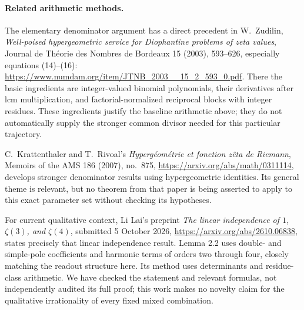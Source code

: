 \documentclass[11pt]{article}
\begin{document}
\paragraph{Related arithmetic methods.}
The elementary denominator argument has a direct precedent in
W.~Zudilin, \emph{Well-poised hypergeometric service for Diophantine problems
of zeta values}, Journal de Th\'eorie des Nombres de Bordeaux
15 (2003), 593--626, especially equations (14)--(16):
\url{https://www.numdam.org/item/JTNB_2003__15_2_593_0.pdf}.
There the basic ingredients are integer-valued binomial polynomials,
their derivatives after lcm multiplication, and factorial-normalized
reciprocal blocks with integer residues. These ingredients justify the
baseline arithmetic above; they do not automatically supply the stronger
common divisor needed for this particular trajectory.

C.~Krattenthaler and T.~Rivoal's \emph{Hyperg\'eom\'etrie et fonction z\^eta de
Riemann}, Memoirs of the AMS 186 (2007), no.~875,
\url{https://arxiv.org/abs/math/0311114}, develops stronger denominator
results using hypergeometric identities. Its general theme is relevant,
but no theorem from that paper is being asserted to apply to this exact
parameter set without checking its hypotheses.

For current qualitative context, Li Lai's preprint
\emph{The linear independence of $1$, $\zeta(3)$, and $\zeta(4)$},
submitted 5 October 2026,
\url{https://arxiv.org/abs/2610.06838}, states precisely that linear
independence result. Lemma 2.2 uses double- and simple-pole coefficients
and harmonic terms of orders two through four, closely matching the
readout structure here. Its method uses determinants and residue-class
arithmetic. We have checked the statement and relevant formulas, not
independently audited its full proof; this work makes no novelty claim
for the qualitative irrationality of every fixed mixed combination.

\appendix
\end{document}
